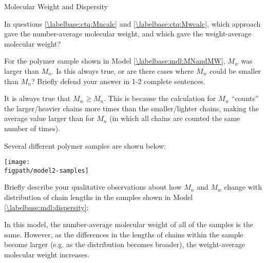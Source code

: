 \begin{activity}{Molecular Weight and Dispersity}
\begin{ctqs}
	\question In questions \ref{\labelbase:ctq:Mncalc} and \ref{\labelbase:ctq:Mwcalc}, which approach gave the number-average molecular weight, and which gave the weight-average molecular weight?
	
		\begin{solution}[1.5in]\end{solution}
	
	\question For the polymer sample shown in Model \ref{\labelbase:mdl:MNandMW}, $M_w$ was larger than $M_n$.  Is this always true, or are there cases where $M_w$ could be smaller than $M_n$?  Briefly defend your answer in 1-2 complete sentences.
	
		\label{\labelbase:ctq:MWvsMN}
		
		\begin{solution}[2in]
		
			It is always true that $M_w \geq M_n$.  This is because the calculation for $M_w$ ``counts'' the larger/heavier chains more times than the smaller/lighter chains, making the average value larger than for $M_n$ (in which all chains are counted the same number of times).
			
		\end{solution}
	
		
\end{ctqs}

\begin{model}
\label{\labelbase:mdl:dispersity}

	Several different polymer samples are shown below:
	
	\vspace{6pt}
	\centerline{\texttt{[image: \\figpath/model2-samples]}}

\end{model}
	
\begin{ctqs}

	\question Briefly describe your qualitative observations about how $M_n$ and $M_w$ change with distribution of chain lengths in the samples shown in Model \ref{\labelbase:mdl:dispersity}:
	
		\begin{solution}[2in]
			In this model, the number-average molecular weight of all of the samples is the same.  However, as the differences in the lengths of chains within the sample become larger (e.g. as the distribution becomes broader), the weight-average molecular weight increases.
		\end{solution}
	

\end{ctqs}
\end{activity}
